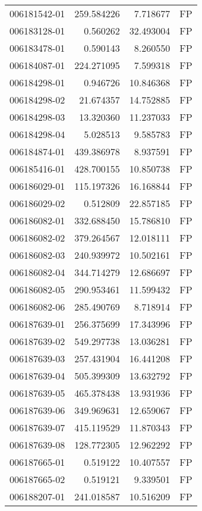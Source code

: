 \begin{tabular}{lrrl}
006181542-01 &  259.584226 &     7.718677 &   FP \\
006183128-01 &    0.560262 &    32.493004 &   FP \\
006183478-01 &    0.590143 &     8.260550 &   FP \\
006184087-01 &  224.271095 &     7.599318 &   FP \\
006184298-01 &    0.946726 &    10.846368 &   FP \\
006184298-02 &   21.674357 &    14.752885 &   FP \\
006184298-03 &   13.320360 &    11.237033 &   FP \\
006184298-04 &    5.028513 &     9.585783 &   FP \\
006184874-01 &  439.386978 &     8.937591 &   FP \\
006185416-01 &  428.700155 &    10.850738 &   FP \\
006186029-01 &  115.197326 &    16.168844 &   FP \\
006186029-02 &    0.512809 &    22.857185 &   FP \\
006186082-01 &  332.688450 &    15.786810 &   FP \\
006186082-02 &  379.264567 &    12.018111 &   FP \\
006186082-03 &  240.939972 &    10.502161 &   FP \\
006186082-04 &  344.714279 &    12.686697 &   FP \\
006186082-05 &  290.953461 &    11.599432 &   FP \\
006186082-06 &  285.490769 &     8.718914 &   FP \\
006187639-01 &  256.375699 &    17.343996 &   FP \\
006187639-02 &  549.297738 &    13.036281 &   FP \\
006187639-03 &  257.431904 &    16.441208 &   FP \\
006187639-04 &  505.399309 &    13.632792 &   FP \\
006187639-05 &  465.378438 &    13.931936 &   FP \\
006187639-06 &  349.969631 &    12.659067 &   FP \\
006187639-07 &  415.119529 &    11.870343 &   FP \\
006187639-08 &  128.772305 &    12.962292 &   FP \\
006187665-01 &    0.519122 &    10.407557 &   FP \\
006187665-02 &    0.519121 &     9.339501 &   FP \\
006188207-01 &  241.018587 &    10.516209 &   FP \\

\end{tabular}
